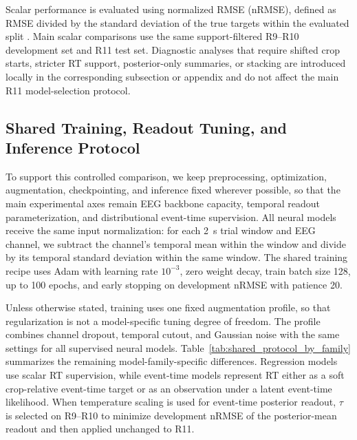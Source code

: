 \documentclass[12pt]{article}
\begin{document}
Scalar performance is evaluated using normalized RMSE (nRMSE), defined as RMSE divided by the standard deviation of the true targets within the evaluated split \citep{EEGChallengeWebsite2025}. Main scalar comparisons use the same support-filtered R9--R10 development set and R11 test set. Diagnostic analyses that require shifted crop starts, stricter RT support, posterior-only summaries, or stacking are introduced locally in the corresponding subsection or appendix and do not affect the main R11 model-selection protocol.

\subsection{Shared Training, Readout Tuning, and Inference Protocol}
\label{sec:shared_protocol}

To support this controlled comparison, we keep preprocessing, optimization, augmentation, checkpointing, and inference fixed wherever possible, so that the main experimental axes remain EEG backbone capacity, temporal readout parameterization, and distributional event-time supervision. All neural models receive the same input normalization: for each 2~s trial window and EEG channel, we subtract the channel's temporal mean within the window and divide by its temporal standard deviation within the same window. The shared training recipe uses Adam with learning rate \(10^{-3}\), zero weight decay, train batch size 128, up to 100 epochs, and early stopping on development nRMSE with patience 20.

Unless otherwise stated, training uses one fixed augmentation profile, so that regularization is not a model-specific tuning degree of freedom. The profile combines channel dropout, temporal cutout, and Gaussian noise with the same settings for all supervised neural models. Table~\ref{tab:shared_protocol_by_family} summarizes the remaining model-family-specific differences. Regression models use scalar RT supervision, while event-time models represent RT either as a soft crop-relative event-time target or as an observation under a latent event-time likelihood. When temperature scaling is used for event-time posterior readout, \(\tau\) is selected on R9--R10 to minimize development nRMSE of the posterior-mean readout and then applied unchanged to R11.
\end{document}
